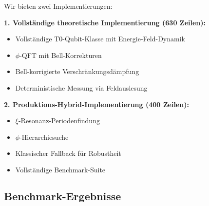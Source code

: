 Wir bieten zwei Implementierungen:

\textbf{1. Vollständige theoretische Implementierung (630 Zeilen):}
\begin{itemize}
	\item Vollständige T0-Qubit-Klasse mit Energie-Feld-Dynamik
	\item $\phi$-QFT mit Bell-Korrekturen
	\item Bell-korrigierte Verschränkungsdämpfung
	\item Deterministische Messung via Feldauslesung
\end{itemize}

\textbf{2. Produktions-Hybrid-Implementierung (400 Zeilen):}
\begin{itemize}
	\item $\xi$-Resonanz-Periodenfindung
	\item $\phi$-Hierarchiesuche
	\item Klassischer Fallback für Robustheit
	\item Vollständige Benchmark-Suite
\end{itemize}

\subsection{Benchmark-Ergebnisse}

\begin{table}[h]
	\centering
	\caption{T0-Shor-Leistung auf Benchmark-Suite}
	\label{tab:benchmark}
\end{table}

